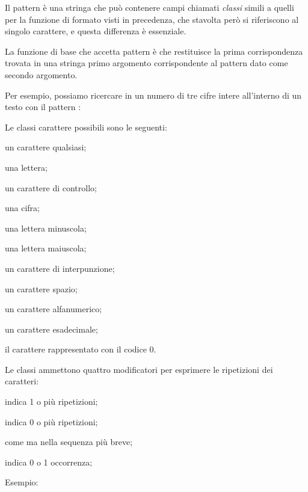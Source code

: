 Il pattern è una stringa che può contenere campi chiamati \emph{classi} simili
a quelli per la funzione di formato visti in precedenza, che stavolta però si
riferiscono al singolo carattere, e questa differenza è essenziale.

La funzione di base che accetta pattern è  che restituisce
la prima corrispondenza trovata in una stringa primo argomento corrispondente
al pattern dato come secondo argomento.

Per esempio, possiamo ricercare in un numero di tre cifre intere all'interno di
un testo con il pattern :

Le classi carattere possibili sono le seguenti:
\begin{compactdescription}
  \item[\key{.}] un carattere qualsiasi;
  \item[\key{\%a}] una lettera;
  \item[\key{\%c}] un carattere di controllo;
  \item[\key{\%d}] una cifra;
  \item[\key{\%l}] una lettera minuscola;
  \item[\key{\%u}] una lettera maiuscola;
  \item[\key{\%p}] un carattere di interpunzione;
  \item[\key{\%s}] un carattere spazio;
  \item[\key{\%w}] un carattere alfanumerico;
  \item[\key{\%x}] un carattere esadecimale;
  \item[\key{\%z}] il carattere rappresentato con il codice 0.
\end{compactdescription}

Le classi ammettono quattro modificatori per esprimere le ripetizioni dei
caratteri:
\begin{compactdescription}
  \item[\key{+}] indica 1 o più ripetizioni;
  \item[\key{*}] indica 0 o più ripetizioni;
  \item[\key{-}] come \key{*} ma nella sequenza più breve;
  \item[\key{?}] indica 0 o 1 occorrenza;
\end{compactdescription}

Esempio:

